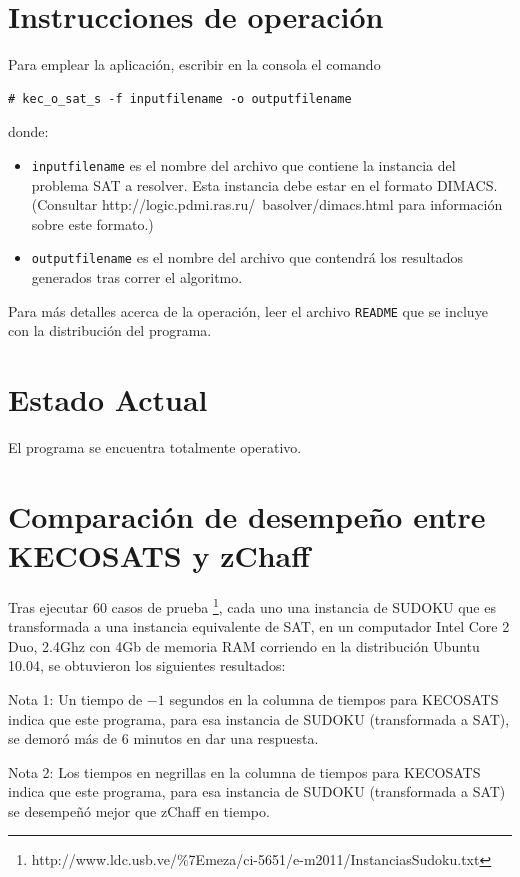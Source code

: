 \documentclass[12pt,lettersize,oneside]{article}
\begin{document}
\section{Instrucciones de operación}
Para emplear la aplicación, escribir en la consola el comando
\begin{lstlisting}[style=consola]
# kec_o_sat_s -f inputfilename -o outputfilename 
\end{lstlisting}
\noindent donde:
\vspace{-2.5mm}
\begin{itemize}
\item {\tt inputfilename} es el nombre del archivo que contiene la instancia del
  problema SAT a resolver. Esta instancia debe estar en el formato DIMACS.
(Consultar http://logic.pdmi.ras.ru/~basolver/dimacs.html para información sobre
este formato.)
\item {\tt outputfilename} es el nombre del archivo que contendrá los resultados
  generados tras correr el algoritmo.
\end{itemize}

Para más detalles acerca de la operación, leer el archivo {\tt README} que se
incluye con la distribución del programa.
\section{Estado Actual}
El programa se encuentra totalmente operativo.

\section{Comparación de desempeño entre KECOSATS y zChaff}

Tras ejecutar $60$ casos de prueba
\footnote{http://www.ldc.usb.ve/\%7Emeza/ci-5651/e-m2011/InstanciasSudoku.txt},
cada uno una instancia de SUDOKU que es transformada a una instancia equivalente
de SAT, en un computador Intel Core 2 Duo, 2.4Ghz con 4Gb de memoria RAM
corriendo en la distribución Ubuntu 10.04, se
obtuvieron los siguientes resultados:

Nota 1: Un tiempo de $-1$ segundos en la columna de tiempos para KECOSATS indica que
este programa, para esa instancia de SUDOKU (transformada a SAT), se demoró más
de $6$ minutos en dar una respuesta.

Nota 2: Los tiempos en negrillas en la columna de tiempos para KECOSATS indica
que este programa, para esa instancia de SUDOKU (transformada a SAT) se
desempeñó mejor que zChaff en tiempo.
\end{document}
